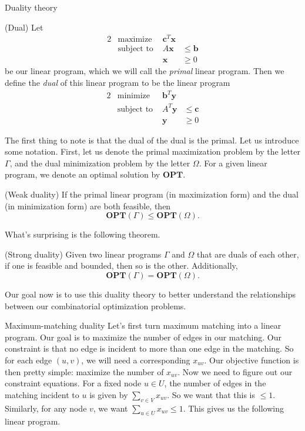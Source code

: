\begin{section}{Duality theory}
\begin{definition}{(Dual)}
		Let 
		\begin{alignat*}{2}
			& \text{maximize } & \mathbf{c}^{T}\mathbf{x} \\
			& \text{subject to } & A\mathbf{x} & \leq \mathbf{b} \\
			&& \mathbf{x} &\geq 0
		\end{alignat*}
		be our linear program, which we will call the \emph{primal} linear program. Then we 
		define the \emph{dual} of this linear program to be the linear program
		\begin{alignat*}{2}
			& \text{minimize } & \mathbf{b}^{T}\mathbf{y} \\
			& \text{subject to } & A^{T}\mathbf{y} & \leq \mathbf{c} \\
			&& \mathbf{y} &\geq 0
		\end{alignat*}
	\end{definition}
	The first thing to note is that the dual of the dual is the primal. Let us introduce some 
	notation. First, let us denote the primal maximization problem by the letter $\Gamma$, and 
	the dual minimization problem by the letter $\Omega$. For a given linear program, we denote 
	an optimal solution by $\mathbf{OPT}$. 

	\begin{theorem}{(Weak duality)}
		If the primal linear program (in maximization form) and the dual (in minimization 
		form) are both feasible, then 
		\[
			\mathbf{OPT}(\Gamma) \leq \mathbf{OPT}(\Omega).
		\]
	\end{theorem}
	What's surprising is the following theorem.

	\begin{theorem}{(Strong duality)}
		Given two linear programs $\Gamma$ and $\Omega$ that are duals of each other, if one is 
		feasible and bounded, then so is the other. Additionally, 
		\[
			\mathbf{OPT}(\Gamma) = \mathbf{OPT}(\Omega).
		\]
	\end{theorem}
	Our goal now is to use this duality theory to better understand the relationships between 
	our combinatorial optimization problems.

\begin{subsection}{Maximum-matching duality}
	Let's first turn maximum matching into a linear program. Our goal is to maximize the number 
	of edges in our matching. Our constraint is that no edge is incident to more than one edge 
	in the matching. So for each edge $(u,v)$, we will need a corresponding $x_{uv}$. Our objective 
	function is then pretty simple: maximize the number of $x_{uv}$. Now we need to figure out 
	our constraint equations. For a fixed node $u\in U$, the number of edges in the matching 
	incident 
	to $u$ is given by $\sum_{v\in V} x_{uv}$. So we want that this is $\leq 1$. Similarly, for any 
	node $v$, we want $\sum_{u\in U} x_{uv} \leq 1$. This gives us the following linear program.


\end{subsection}
\end{section}
